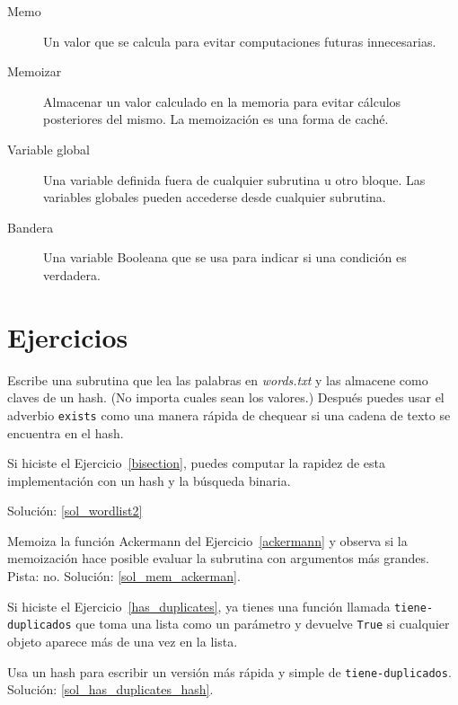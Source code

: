 \begin{description}
\item[Memo] Un valor que se calcula para evitar computaciones futuras
innecesarias.

\item[Memoizar] Almacenar un valor calculado en la memoria para
evitar cálculos posteriores del mismo. La memoización es una forma
de caché.

\item[Variable global]  Una variable definida fuera de cualquier subrutina
u otro bloque. Las variables globales pueden accederse desde cualquier
subrutina.

\item[Bandera] Una variable Booleana que se usa para indicar si una 
condición es verdadera.

\end{description}


\section{Ejercicios}

\begin{exercise}
\label{wordlist2}

Escribe una subrutina que lea las palabras en \emph{words.txt}
y las almacene como claves de un hash. (No importa cuales sean los
valores.) Después puedes usar el adverbio {\tt exists} como una manera
rápida de chequear si una cadena de texto se encuentra en el hash.

Si hiciste el Ejercicio~\ref{bisection}, puedes computar la
rapidez de esta implementación con un hash y la búsqueda binaria.

Solución: \ref{sol_wordlist2}

\end{exercise}


\begin{exercise}
\label{mem_ackerman}
Memoiza la función Ackermann del Ejercicio~\ref{ackermann}
y observa si la memoización hace posible evaluar la subrutina
con argumentos más grandes. Pista: no.
Solución: \ref{sol_mem_ackerman}.

\end{exercise}



\begin{exercise}
\label{has_duplicates_hash}

Si hiciste el Ejercicio~\ref{has_duplicates}, ya tienes una función
llamada \verb|tiene-duplicados| que toma una lista como un 
parámetro y devuelve {\tt True} si cualquier objeto aparece más
de una vez en la lista.

Usa un hash para escribir un versión más rápida y simple
de \verb|tiene-duplicados|.
Solución: \ref{sol_has_duplicates_hash}.

\end{exercise}


